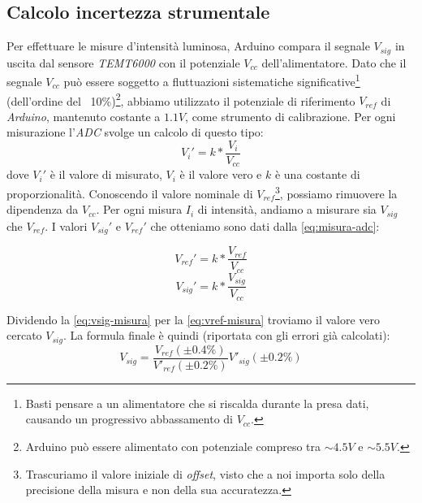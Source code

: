\subsection{Calcolo incertezza strumentale}\label{subsec:calcolo-incertezza-strumentale}
  Per effettuare le misure d'intensità luminosa, Arduino compara
  il segnale $V_{sig}$ in uscita dal sensore \emph{TEMT6000} con il potenziale
  $V_{cc}$ dell'alimentatore.
  Dato che il segnale $V_{cc}$ può essere soggetto a fluttuazioni sistematiche significative\footnote{Basti pensare a un alimentatore che si riscalda durante la presa dati,
  causando un progressivo abbassamento di $V_{cc}$.}
  (dell'ordine del ~10\%)\footnote{Arduino può essere alimentato con potenziale compreso tra $\sim 4.5V$ e $\sim 5.5V$.}, abbiamo utilizzato il potenziale di riferimento
  $V_{ref}$ di \emph{Arduino}, mantenuto costante a $1.1V$, come strumento di
  calibrazione.
  Per ogni misurazione l'\emph{ADC} svolge un calcolo di questo tipo:
  \begin{equation}
    V_i' = k * \frac {V_i} {V_{cc}}
    \label{eq:misura-adc}
  \end{equation}
  \noindent dove $V_i'$ è il valore di misurato, $V_i$ è il valore vero e $k$
  è una costante di proporzionalità. Conoscendo il valore nominale
  di $V_{ref}$\footnote{Trascuriamo il valore iniziale di \emph{offset}, visto che
  a noi importa solo della precisione della misura e non della sua accuratezza.}, possiamo rimuovere la
  dipendenza da $V_{cc}$. Per ogni misura $I_i$ di intensità, andiamo a misurare sia $V_{sig}$ che $V_{ref}$.
  I valori $V_{sig}'$ e $V_{ref}'$ che otteniamo sono dati dalla \eqref{eq:misura-adc}:
  \vspace{-10mm}
  \begin{multicols}{2}
    \begin{equation}
      V_{ref}' = k * \frac {V_{ref}} {V_{cc}}
      \label{eq:vref-misura}
    \end{equation}
  \break
    \begin{equation}
      V_{sig}' = k * \frac {V_{sig}} {V_{cc}}
      \label{eq:vsig-misura}
    \end{equation}
  \end{multicols}
  \noindent Dividendo la \eqref{eq:vsig-misura} per la \eqref{eq:vref-misura} troviamo il valore vero cercato $V_{sig}$.
  La formula finale è quindi (riportata con gli errori già calcolati):
  \begin{equation}
    V_{sig} = \frac {
      V_{ref} (\pm 0.4\%)
    } {
      V'_{ref} (\pm 0.2\%)
    } V'_{sig} (\pm 0.2\%)
    \label{eq:misura-intensità}
  \end{equation}
